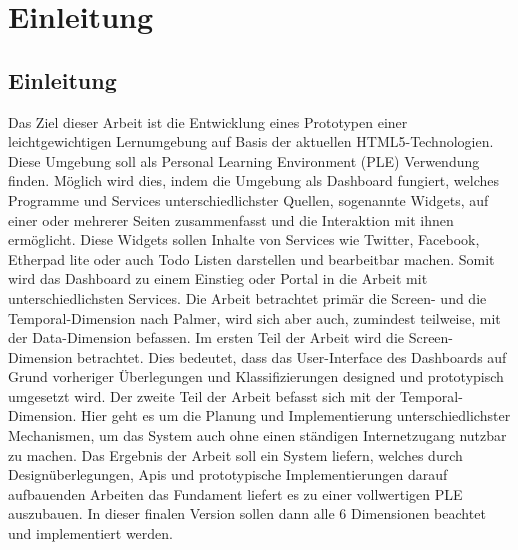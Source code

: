 \chapter{Einleitung} 
\label{Kapitel 1}
\section{Einleitung}
Das Ziel dieser Arbeit ist die Entwicklung eines Prototypen einer leichtgewichtigen Lernumgebung auf Basis der aktuellen HTML5-Technologien. Diese Umgebung soll als Personal Learning Environment (PLE) Verwendung finden. Möglich wird dies, indem die Umgebung als Dashboard fungiert, welches Programme und Services unterschiedlichster Quellen, sogenannte Widgets, auf einer oder mehrerer Seiten zusammenfasst und die Interaktion mit ihnen ermöglicht. Diese Widgets sollen Inhalte von Services wie Twitter, Facebook, Etherpad lite oder auch Todo Listen darstellen und bearbeitbar machen. Somit wird das Dashboard zu einem Einstieg oder Portal in die Arbeit mit unterschiedlichsten Services. 
Die Arbeit betrachtet primär die Screen- und die Temporal-Dimension nach Palmer, wird sich aber auch, zumindest teilweise, mit der Data-Dimension befassen. Im ersten Teil der Arbeit wird die Screen-Dimension betrachtet. Dies bedeutet, dass das User-Interface des Dashboards auf Grund vorheriger Überlegungen und Klassifizierungen designed und prototypisch umgesetzt wird. Der zweite Teil der Arbeit befasst sich mit der Temporal-Dimension. Hier geht es um die Planung und Implementierung unterschiedlichster Mechanismen, um das System auch ohne einen ständigen Internetzugang nutzbar zu machen.
Das Ergebnis der Arbeit soll ein System liefern, welches durch Designüberlegungen, Apis und prototypische Implementierungen darauf aufbauenden Arbeiten das Fundament liefert es zu einer vollwertigen PLE auszubauen. In dieser finalen Version sollen dann alle 6 Dimensionen beachtet und implementiert werden.